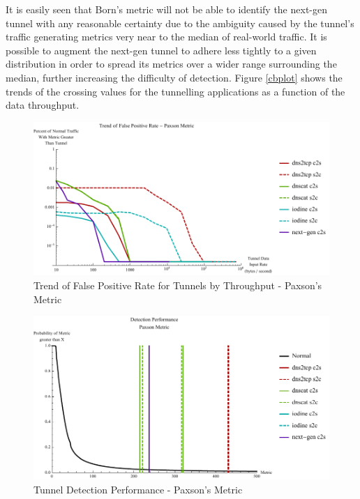 \documentclass[12pt]{report}
\theoremstyle{remark}
\theoremstyle{definition}
\theoremstyle{definition}
\theoremstyle{definition}
\begin{document}
It is easily seen that Born's metric will not be able to identify the next-gen
tunnel with any reasonable certainty due to the ambiguity caused by the tunnel's
traffic generating metrics very near to the median of real-world traffic. It is
possible to augment the next-gen tunnel to adhere less tightly to a given
distribution in order to spread its metrics over a wider range surrounding the
median, further increasing the difficulty of detection. Figure \ref{cbplot}
shows the trends of the crossing values for the tunnelling applications as a
function of the data throughput.


\begin{figure}
\centering
\includegraphics[width=\textwidth]{figures/cpplot.pdf}
\caption[Trend of False Positive Rate for Tunnels by Throughput - Paxson's 
Metric]{Trend of False Positive Rate for Tunnels by Throughput - Paxson's 
Metric}
\label{cpplot}
\end{figure}

\begin{figure}
\centering
\includegraphics[width=\textwidth]{figures/mppv-500.pdf}
\caption[Tunnel Detection Performance - Paxson's Metric]{Tunnel Detection 
Performance - Paxson's Metric}
\label{mppv}
\end{figure}
\end{document}
